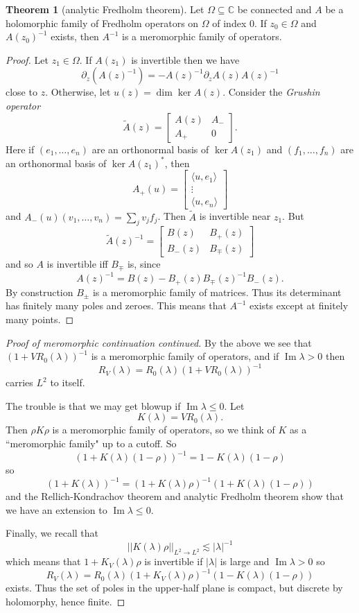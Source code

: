 \documentclass[12pt]{report}
\newcommand{\CC}{\mathbb{C}}
\renewcommand{\Im}{\operatorname{Im}}
\newcommand{\dfn}[1]{\emph{#1}\index{#1}}
\theoremstyle{definition}
\newtheorem{theorem}{Theorem}[chapter]
\begin{document}
\begin{theorem}[analytic Fredholm theorem]
Let $\Omega \subseteq \CC$ be connected and $A$ be a holomorphic family of Fredholm operators on $\Omega$ of index $0$. If $z_0 \in \Omega$ and $A(z_0)^{-1}$ exists, then $A^{-1}$ is a meromorphic family of operators.
\end{theorem}
\begin{proof}
Let $z_1 \in \Omega$. If $A(z_1)$ is invertible then we have
$$\partial_z(A(z)^{-1}) = -A(z)^{-1}\partial_zA(z)A(z)^{-1}$$
close to $z$. Otherwise, let $u(z) = \dim \ker A(z)$. Consider the \dfn{Grushin operator}
$$\tilde A(z) = \begin{bmatrix}A(z)&A_-\\A_+&0\end{bmatrix}.$$
Here if $(e_1, \dots, e_n)$ are an orthonormal basis of $\ker A(z_1)$ and $(f_1, \dots, f_n)$ are an orthonormal basis of $\ker A(z_1)^*$, then
$$A_+(u) = \begin{bmatrix}
\langle u, e_1\rangle \\ \vdots \\ \langle u, e_n \rangle
\end{bmatrix}$$
and $A_-(u)(v_1, \dots, v_n) = \sum_j v_j f_j$.
Then $\tilde A$ is invertible near $z_1$. But
$$\tilde A(z)^{-1} = \begin{bmatrix}B(z)&B_+(z)\\B_-(z)&B_\mp(z)\end{bmatrix}$$
and so $A$ is invertible iff $B_\mp$ is, since
$$A(z)^{-1} = B(z) - B_+(z)B_\mp(z)^{-1}B_-(z).$$
By construction $B_\pm$ is a meromorphic family of matrices. Thus its determinant has finitely many poles and zeroes. This means that $A^{-1}$ exists except at finitely many points.
\end{proof}

\begin{proof}[Proof of meromorphic continuation continued]
By the above we see that $(1 + VR_0(\lambda))^{-1}$ is a meromorphic family of operators, and if $\Im \lambda > 0$ then
$$R_V(\lambda) = R_0(\lambda)(1 + VR_0(\lambda))^{-1}$$
carries $L^2$ to itself.

The trouble is that we may get blowup if $\Im \lambda \leq 0$. Let
$$K(\lambda) = VR_0(\lambda).$$
Then $\rho K \rho$ is a meromorphic family of operators, so we think of $K$ as a ``meromorphic family" up to a cutoff.
So
$$(1 + K(\lambda)(1-\rho))^{-1} = 1 - K(\lambda)(1 - \rho)$$
so
$$(1 + K(\lambda))^{-1} = (1 + K(\lambda)\rho)^{-1}(1 + K(\lambda)(1 - \rho))$$
and the Rellich-Kondrachov theorem and analytic Fredholm theorem show that we have an extension to $\Im \lambda \leq 0$.

Finally, we recall that
$$||K(\lambda)\rho||_{L^2 \to L^2} \lesssim |\lambda|^{-1}$$
which means that $1 + K_V(\lambda)\rho$ is invertible if $|\lambda|$ is large and $\Im \lambda > 0$ so
$$R_V(\lambda) = R_0(\lambda)(1 + K_V(\lambda)\rho)^{-1}(1 - K(\lambda)(1 - \rho))$$
exists. Thus the set of poles in the upper-half plane is compact, but discrete by holomorphy, hence finite.
\end{proof}
\end{document}
